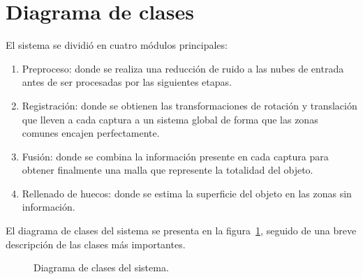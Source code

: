 \section{Diagrama de clases}
El sistema se dividió en cuatro módulos principales:
\begin{enumerate}
	\item Preproceso:
		donde se realiza una reducción de ruido a las nubes de entrada
		antes de ser procesadas por las siguientes etapas.
	\item Registración:
		donde se obtienen las transformaciones de rotación y translación
		que lleven a cada captura a un sistema global
		de forma que las zonas comunes encajen perfectamente.
	\item Fusión:
		donde se combina la información presente en cada captura
		para obtener finalmente una malla que represente la totalidad del objeto.
	\item Rellenado de huecos:
		donde se estima la superficie del objeto en las zonas sin información.
\end{enumerate}

El diagrama de clases del sistema se presenta en la figura~\ref{fig:diagrama_de_clases},
seguido de una breve descripción de las clases más importantes.

\begin{figure}[h]
	\caption[Diagrama de clases del sistema]{\label{fig:diagrama_de_clases}Diagrama de clases del sistema.}
\end{figure}


